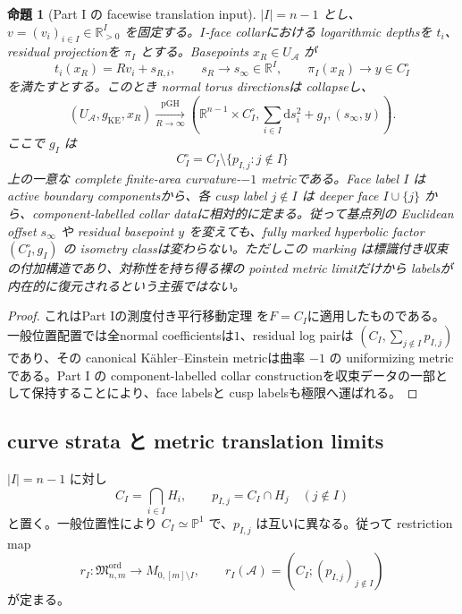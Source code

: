 \documentclass[11pt,a4paper]{ltjsarticle}
\newcommand{\PP}{\mathbb P}
\newcommand{\RR}{\mathbb R}
\newcommand{\dd}{\mathrm d}
\newcommand{\cA}{\mathcal A}
\newcommand{\Mord}{\mathfrak M^{\mathrm{ord}}}
\theoremstyle{plain}
\newtheorem{proposition}[proposition]{命題}
\theoremstyle{definition}
\theoremstyle{remark}
\begin{document}
\begin{proposition}[Part I の facewise translation input]
\label{prop:partI-translation}
$|I|=n-1$ とし、$v=(v_i)_{i\in I}\in\RR_{>0}^{I}$ を固定する。$I$-face collarにおける logarithmic depthsを $t_i$、residual projectionを $\pi_I$ とする。Basepoints $x_R\in U_{\cA}$ が
\[
 t_i(x_R)=Rv_i+s_{R,i},\qquad
 s_R\longrightarrow s_\infty\in\RR^I,
 \qquad
 \pi_I(x_R)\longrightarrow y\in C_I^\circ
\]
を満たすとする。このとき normal torus directionsは collapseし、
\[
 (U_{\cA},g_{\mathrm{KE}},x_R)
 \xrightarrow[R\to\infty]{\mathrm{pGH}}
 \left(
 \RR^{n-1}\times C_I^\circ,
 \sum_{i\in I}\dd s_i^2+g_I,
 (s_\infty,y)
 \right).
\]
ここで $g_I$ は
\[
 C_I^\circ=C_I\setminus\{p_{I,j}:j\notin I\}
\]
上の一意な complete finite-area curvature-$-1$ metricである。Face label $I$ は active boundary componentsから、各 cusp label $j\notin I$ は deeper face $I\cup\{j\}$ から、component-labelled collar dataに相対的に定まる。従って基点列の Euclidean offset $s_\infty$ や residual basepoint $y$ を変えても、fully marked hyperbolic factor $(C_I^\circ,g_I)$ の isometry classは変わらない。ただしこの marking は標識付き収束の付加構造であり、対称性を持ち得る裸の pointed metric limitだけから labelsが内在的に復元されるという主張ではない。
\end{proposition}

\begin{proof}
これはPart Iの測度付き平行移動定理
\cite[\texttt{thm:translation}]{UedaI}を$F=C_I$に適用したものである。
一般位置配置では全normal coefficientsは$1$、residual log pairは
$(C_I,\sum_{j\notin I}p_{I,j})$ であり、その canonical K\"ahler--Einstein metricは曲率 $-1$ の uniformizing metricである。Part I の component-labelled collar constructionを収束データの一部として保持することにより、face labelsと cusp labelsも極限へ運ばれる。
\end{proof}

\subsection{curve strata と metric translation limits}
$|I|=n-1$ に対し
\[
 C_I=\bigcap_{i\in I}H_i,\qquad
 p_{I,j}=C_I\cap H_j\quad(j\notin I)
\]
と置く。一般位置性により $C_I\simeq\PP^1$ で、$p_{I,j}$ は互いに異なる。従って restriction map
\begin{equation}
\label{eq:periodfactor}
 r_I:\Mord_{n,m}\longrightarrow M_{0,[m]\setminus I},
 \qquad
 r_I(\cA)=(C_I;(p_{I,j})_{j\notin I})
\end{equation}
が定まる。
\end{document}
